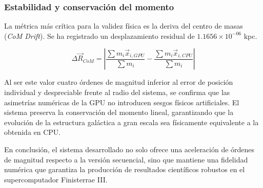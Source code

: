 \subsubsection{Estabilidad y conservación del momento}
La métrica más crítica para la validez física es la deriva del centro de masas (\textit{CoM Drift}). Se ha registrado un desplazamiento residual de $1.1656 \times 10^{-06}$ kpc.

\begin{equation}
    \Delta \vec{R}_{CoM} = \left| \frac{\sum m_i \vec{x}_{i,GPU}}{\sum m_i} - \frac{\sum m_i \vec{x}_{i,CPU}}{\sum m_i} \right|
\end{equation}

Al ser este valor cuatro órdenes de magnitud inferior al error de posición individual y despreciable frente al radio del sistema, se confirma que las asimetrías numéricas de la GPU no introducen sesgos físicos artificiales.
El sistema preserva la conservación del momento lineal, garantizando que la evolución de la estructura galáctica a gran escala sea físicamente equivalente a la obtenida en CPU.


En conclusión, el sistema desarrollado no solo ofrece una aceleración de órdenes de magnitud respecto a la versión secuencial, sino que mantiene una fidelidad numérica que garantiza la producción de resultados científicos robustos en el supercomputador Finisterrae III.